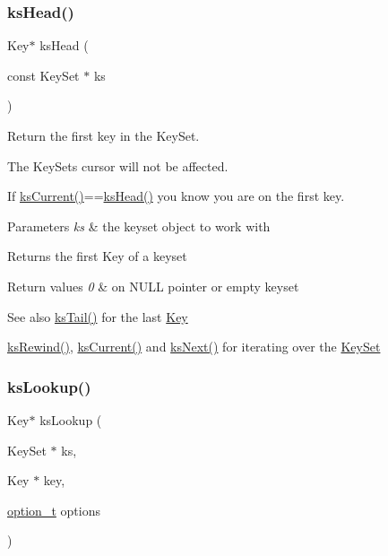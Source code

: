 \subsubsection{\texorpdfstring{ks\+Head()}{ksHead()}}
{\footnotesize\ttfamily Key$\ast$ ks\+Head (\begin{DoxyParamCaption}\item[{const Key\+Set $\ast$}]{ks }\end{DoxyParamCaption})}



Return the first key in the Key\+Set. 

The Key\+Sets cursor will not be affected.

If \hyperlink{group__keyset_ga4287b9416912c5f2ab9c195cb74fb094}{ks\+Current()}==\hyperlink{group__keyset_gae7dbf3aef70e67b5328475eb3d1f92f5}{ks\+Head()} you know you are on the first key.


\begin{DoxyParams}{Parameters}
{\em ks} & the keyset object to work with \\
\hline
\end{DoxyParams}
\begin{DoxyReturn}{Returns}
the first Key of a keyset 
\end{DoxyReturn}

\begin{DoxyRetVals}{Return values}
{\em 0} & on N\+U\+LL pointer or empty keyset \\
\hline
\end{DoxyRetVals}
\begin{DoxySeeAlso}{See also}
\hyperlink{group__keyset_gadca442c4ab43cf532b15091d7711559e}{ks\+Tail()} for the last \hyperlink{group__key}{Key} 

\hyperlink{group__keyset_gabe793ff51f1728e3429c84a8a9086b70}{ks\+Rewind()}, \hyperlink{group__keyset_ga4287b9416912c5f2ab9c195cb74fb094}{ks\+Current()} and \hyperlink{group__keyset_ga317321c9065b5a4b3e33fe1c399bcec9}{ks\+Next()} for iterating over the \hyperlink{group__keyset}{Key\+Set} 
\end{DoxySeeAlso}
\mbox{\label{group__keyset_gaa34fc43a081e6b01e4120daa6c112004}} 
\subsubsection{\texorpdfstring{ks\+Lookup()}{ksLookup()}}
{\footnotesize\ttfamily Key$\ast$ ks\+Lookup (\begin{DoxyParamCaption}\item[{Key\+Set $\ast$}]{ks,  }\item[{Key $\ast$}]{key,  }\item[{\hyperlink{group__keyset_ga98a3d6a4016c9dad9cbd1a99a9c2a45a}{option\+\_\+t}}]{options }\end{DoxyParamCaption})}



